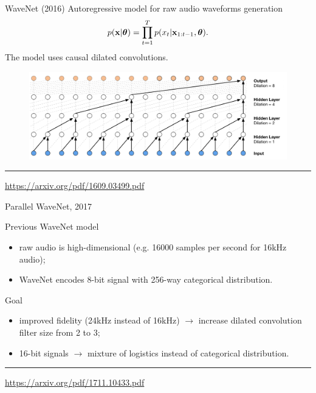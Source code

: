 \begin{frame}{WaveNet (2016)}
	Autoregressive model for raw audio waveforms generation
	\vspace{-0.2cm}
	\[
	p(\mathbf{x}| \boldsymbol{\theta}) = \prod_{t=1}^T p(x_t|\mathbf{x}_{1:t-1}, \boldsymbol{\theta}).
	\]
	\vspace{-0.2cm}
	The model uses causal dilated convolutions.
	\begin{figure}
		\centering
		\includegraphics[width=0.9\linewidth]{figs/wavenet2.png}
	\end{figure}
	\vfill
	\hrule\medskip
	{\scriptsize \href{https://arxiv.org/pdf/1609.03499.pdf}{https://arxiv.org/pdf/1609.03499.pdf}}
\end{frame}
\begin{frame}{Parallel WaveNet, 2017}
	\begin{block}{Previous WaveNet model}
		\begin{itemize}
			\item raw audio is high-dimensional (e.g. 16000 samples per second for 16kHz audio);
			\item WaveNet encodes 8-bit signal with 256-way categorical distribution.
		\end{itemize}
	\end{block}
	\begin{block}{Goal}
		\begin{itemize}
			\item improved fidelity (24kHz instead of 16kHz) $\rightarrow$ increase dilated convolution filter size from 2 to 3;
			\item 16-bit signals $\rightarrow$ mixture of logistics instead of categorical distribution.
		\end{itemize}
	\end{block}
	\vfill
	\hrule\medskip
	{\scriptsize \href{https://arxiv.org/pdf/1711.10433.pdf}{https://arxiv.org/pdf/1711.10433.pdf}}
\end{frame}
